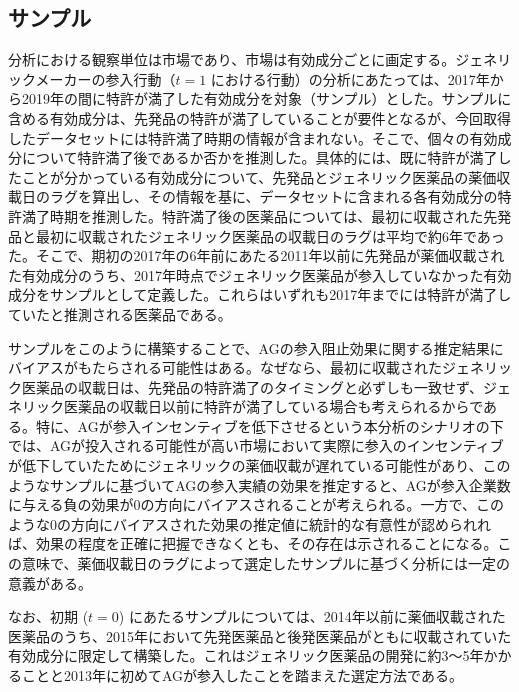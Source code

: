 \documentclass[a4j,10.5pt]{jarticle}
\begin{document}
\subsection{サンプル}
分析における観察単位は市場であり、市場は有効成分ごとに画定する。ジェネリックメーカーの参入行動（$t = 1$ における行動）の分析にあたっては、2017年から2019年の間に特許が満了した有効成分を対象（サンプル）とした。サンプルに含める有効成分は、先発品の特許が満了していることが要件となるが、今回取得したデータセットには特許満了時期の情報が含まれない。そこで、個々の有効成分について特許満了後であるか否かを推測した。具体的には、既に特許が満了したことが分かっている有効成分について、先発品とジェネリック医薬品の薬価収載日のラグを算出し、その情報を基に、データセットに含まれる各有効成分の特許満了時期を推測した。特許満了後の医薬品については、最初に収載された先発品と最初に収載されたジェネリック医薬品の収載日のラグは平均で約6年であった。そこで、期初の2017年の6年前にあたる2011年以前に先発品が薬価収載された有効成分のうち、2017年時点でジェネリック医薬品が参入していなかった有効成分をサンプルとして定義した。これらはいずれも2017年までには特許が満了していたと推測される医薬品である。\par
サンプルをこのように構築することで、AGの参入阻止効果に関する推定結果にバイアスがもたらされる可能性はある。なぜなら、最初に収載されたジェネリック医薬品の収載日は、先発品の特許満了のタイミングと必ずしも一致せず、ジェネリック医薬品の収載日以前に特許が満了している場合も考えられるからである。特に、AGが参入インセンティブを低下させるという本分析のシナリオの下では、AGが投入される可能性が高い市場において実際に参入のインセンティブが低下していたためにジェネリックの薬価収載が遅れている可能性があり、このようなサンプルに基づいてAGの参入実績の効果を推定すると、AGが参入企業数に与える負の効果が0の方向にバイアスされることが考えられる。一方で、このような0の方向にバイアスされた効果の推定値に統計的な有意性が認められれば、効果の程度を正確に把握できなくとも、その存在は示されることになる。この意味で、薬価収載日のラグによって選定したサンプルに基づく分析には一定の意義がある。\par
なお、初期 ($t = 0$) にあたるサンプルについては、2014年以前に薬価収載された医薬品のうち、2015年において先発医薬品と後発医薬品がともに収載されていた有効成分に限定して構築した。これはジェネリック医薬品の開発に約3〜5年かかることと2013年に初めてAGが参入したことを踏まえた選定方法である。
\end{document}
